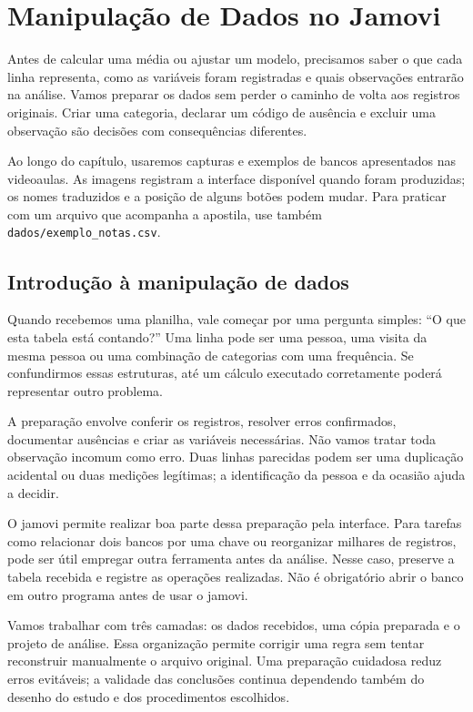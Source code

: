 \chapter{Manipulação de Dados no Jamovi}

\label{cap:manipulacao}

Antes de calcular uma média ou ajustar um modelo, precisamos saber o que cada linha representa, como as variáveis foram registradas e quais observações entrarão na análise. Vamos preparar os dados sem perder o caminho de volta aos registros originais. Criar uma categoria, declarar um código de ausência e excluir uma observação são decisões com consequências diferentes.

Ao longo do capítulo, usaremos capturas e exemplos de bancos apresentados nas videoaulas. As imagens registram a interface disponível quando foram produzidas; os nomes traduzidos e a posição de alguns botões podem mudar. Para praticar com um arquivo que acompanha a apostila, use também \texttt{dados/exemplo\_notas.csv}.

\section{Introdução à manipulação de dados}

Quando recebemos uma planilha, vale começar por uma pergunta simples: ``O que esta tabela está contando?'' Uma linha pode ser uma pessoa, uma visita da mesma pessoa ou uma combinação de categorias com uma frequência. Se confundirmos essas estruturas, até um cálculo executado corretamente poderá representar outro problema.

A preparação envolve conferir os registros, resolver erros confirmados, documentar ausências e criar as variáveis necessárias. Não vamos tratar toda observação incomum como erro. Duas linhas parecidas podem ser uma duplicação acidental ou duas medições legítimas; a identificação da pessoa e da ocasião ajuda a decidir.

O jamovi permite realizar boa parte dessa preparação pela interface. Para tarefas como relacionar dois bancos por uma chave ou reorganizar milhares de registros, pode ser útil empregar outra ferramenta antes da análise. Nesse caso, preserve a tabela recebida e registre as operações realizadas. Não é obrigatório abrir o banco em outro programa antes de usar o jamovi.

Vamos trabalhar com três camadas: os dados recebidos, uma cópia preparada e o projeto de análise. Essa organização permite corrigir uma regra sem tentar reconstruir manualmente o arquivo original. Uma preparação cuidadosa reduz erros evitáveis; a validade das conclusões continua dependendo também do desenho do estudo e dos procedimentos escolhidos.

